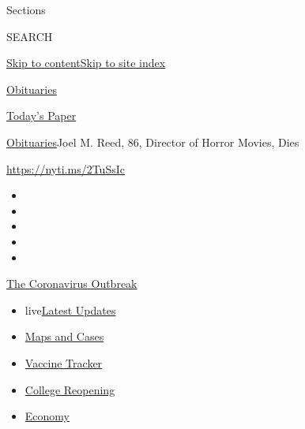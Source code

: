Sections

SEARCH

\protect\hyperlink{site-content}{Skip to
content}\protect\hyperlink{site-index}{Skip to site index}

\href{https://www.nytimes3xbfgragh.onion/section/obituaries}{Obituaries}

\href{https://myaccount.nytimes3xbfgragh.onion/auth/login?response_type=cookie\&client_id=vi}{}

\href{https://www.nytimes3xbfgragh.onion/section/todayspaper}{Today's
Paper}

\href{/section/obituaries}{Obituaries}\textbar{}Joel M. Reed, 86,
Director of Horror Movies, Dies

\url{https://nyti.ms/2TuSsIc}

\begin{itemize}
\item
\item
\item
\item
\item
\end{itemize}

\href{https://www.nytimes3xbfgragh.onion/news-event/coronavirus?action=click\&pgtype=Article\&state=default\&region=TOP_BANNER\&context=storylines_menu}{The
Coronavirus Outbreak}

\begin{itemize}
\tightlist
\item
  live\href{https://www.nytimes3xbfgragh.onion/2020/08/04/world/coronavirus-covid-19.html?action=click\&pgtype=Article\&state=default\&region=TOP_BANNER\&context=storylines_menu}{Latest
  Updates}
\item
  \href{https://www.nytimes3xbfgragh.onion/interactive/2020/us/coronavirus-us-cases.html?action=click\&pgtype=Article\&state=default\&region=TOP_BANNER\&context=storylines_menu}{Maps
  and Cases}
\item
  \href{https://www.nytimes3xbfgragh.onion/interactive/2020/science/coronavirus-vaccine-tracker.html?action=click\&pgtype=Article\&state=default\&region=TOP_BANNER\&context=storylines_menu}{Vaccine
  Tracker}
\item
  \href{https://www.nytimes3xbfgragh.onion/2020/08/02/us/covid-college-reopening.html?action=click\&pgtype=Article\&state=default\&region=TOP_BANNER\&context=storylines_menu}{College
  Reopening}
\item
  \href{https://www.nytimes3xbfgragh.onion/live/2020/08/03/business/stock-market-today-coronavirus?action=click\&pgtype=Article\&state=default\&region=TOP_BANNER\&context=storylines_menu}{Economy}
\end{itemize}

